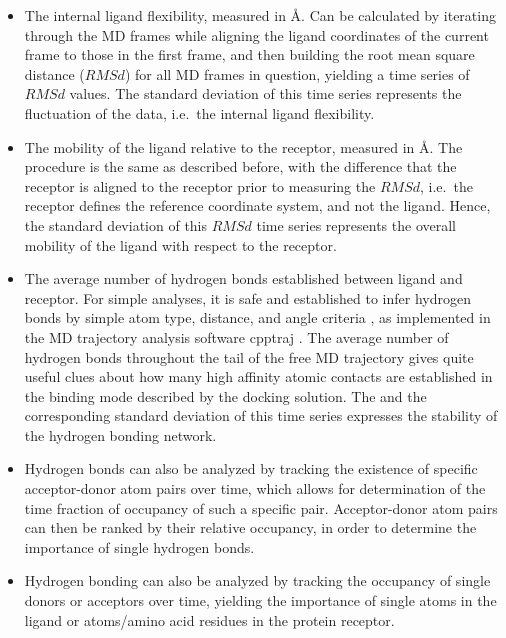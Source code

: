 \begin{itemize}
\item The internal ligand flexibility, measured in \si{\angstrom}. Can be
calculated by iterating through the MD frames while aligning the ligand
coordinates of the current frame to those in the first frame, and then building
the root mean square distance ($RMSd$) for all MD frames in question,
yielding a time series of $RMSd$ values. The standard deviation of this time
series represents the fluctuation of the data, i.e.\ the internal ligand
flexibility.

\item The mobility of the ligand relative to the receptor, measured in
\si{\angstrom}. The procedure is the same as described before, with the
difference that the receptor is aligned to the receptor prior to measuring the
$RMSd$, i.e.\ the receptor defines the reference coordinate system, and not the
ligand. Hence, the standard deviation of this $RMSd$ time series represents the
overall mobility of the ligand with respect to the receptor.

\item The average number of hydrogen bonds established between ligand and
receptor. For simple analyses, it is safe and established to infer hydrogen
bonds by simple atom type, distance, and angle criteria
\cite{hbonds_crystal_survey,hbonds_sulfur_1991}, as implemented in the MD
trajectory analysis software cpptraj \cite{cpptraj_2013}. The average number of
hydrogen bonds throughout the tail of the free MD trajectory gives quite useful
clues about how many high affinity atomic contacts are established in the
binding mode described by the docking solution. The and the corresponding
standard deviation of this time series expresses the stability of the hydrogen
bonding network.

\item Hydrogen bonds can also be analyzed by tracking the existence of specific
acceptor-donor atom pairs over time, which allows for determination of the time
fraction of occupancy of such a specific pair. Acceptor-donor atom pairs can
then be ranked by their relative occupancy, in order to determine the importance
of single hydrogen bonds.

\item Hydrogen bonding can also be analyzed by tracking the occupancy of single
donors or acceptors over time, yielding the importance of single atoms in the
ligand or atoms/amino acid residues in the protein receptor.


\end{itemize}
